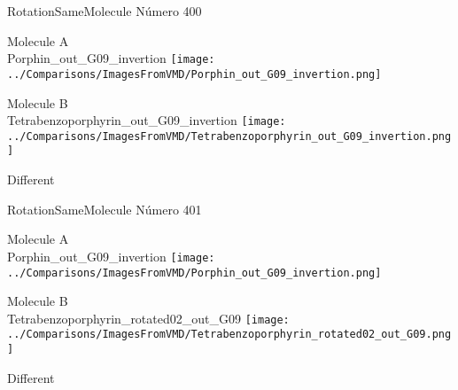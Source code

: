 \vtab[-3cm]
\begin{center}
{\large RotationSameMolecule \tab Número 400}
\end{center}
\begin{multicols}{2}
\begin{center}
Molecule A \\ 
Porphin\_out\_G09\_invertion
\texttt{[image: ../Comparisons/ImagesFromVMD/Porphin\_out\_G09\_invertion.png]}
\\
\vtab

\columnbreak
Molecule B \\ 
Tetrabenzoporphyrin\_out\_G09\_invertion
\texttt{[image: ../Comparisons/ImagesFromVMD/Tetrabenzoporphyrin\_out\_G09\_invertion.png]}
\\
\vtab


\end{center}
\end{multicols}
\begin{center}
\textcolor{NavyBlue}{\Large Different}
\end{center}

 \newpage

\vtab[-3cm]
\begin{center}
{\large RotationSameMolecule \tab Número 401}
\end{center}
\begin{multicols}{2}
\begin{center}
Molecule A \\ 
Porphin\_out\_G09\_invertion
\texttt{[image: ../Comparisons/ImagesFromVMD/Porphin\_out\_G09\_invertion.png]}
\\
\vtab

\columnbreak
Molecule B \\ 
Tetrabenzoporphyrin\_rotated02\_out\_G09
\texttt{[image: ../Comparisons/ImagesFromVMD/Tetrabenzoporphyrin\_rotated02\_out\_G09.png]}
\\
\vtab


\end{center}
\end{multicols}
\begin{center}
\textcolor{NavyBlue}{\Large Different}
\end{center}

 \newpage

